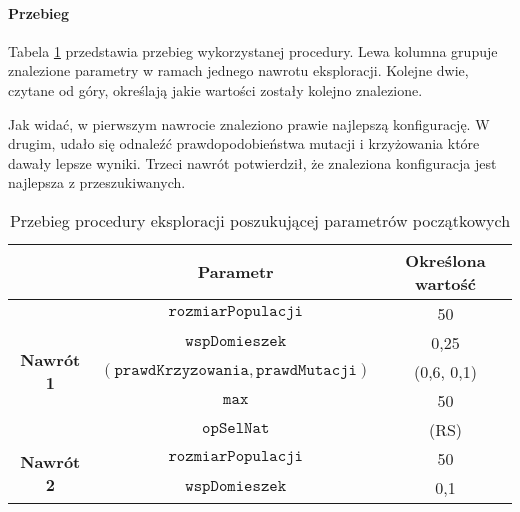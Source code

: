 \documentclass[twoside]{iisthesis}
\newcommand{\param}[1]{\mathtt{#1}}
\newcommand{\opName}[1]{\textproc{#1}}
\begin{document}
\paragraph{Przebieg}

Tabela \ref{table:knapsack_init_flow} przedstawia przebieg wykorzystanej procedury. 
Lewa kolumna grupuje znalezione parametry w ramach jednego nawrotu eksploracji. 
Kolejne dwie, czytane od góry, określają jakie wartości zostały kolejno znalezione.

Jak widać, w pierwszym nawrocie znaleziono prawie najlepszą konfigurację. 
W drugim, udało się odnaleźć prawdopodobieństwa mutacji i krzyżowania które dawały lepsze wyniki.
Trzeci nawrót potwierdził, że znaleziona konfiguracja jest najlepsza z przeszukiwanych.

\begin{table}[h]
	\caption{Przebieg procedury eksploracji poszukującej parametrów początkowych \label{table:knapsack_init_flow}}
	\centering
	\begin{tabular}{c|c|c|}
		\cline{2-3}
		\multicolumn{1}{l|}{}                                 & {\bf Parametr}                                     & {\bf Określona wartość} \\ \hline
		\multicolumn{1}{|c|}{\multirow{5}{*}{{\bf Nawrót 1}}} & $\param{rozmiarPopulacji}$                         & 50                      \\ \cline{2-3} 
		\multicolumn{1}{|c|}{}                                & $\param{wspDomieszek}$                             & 0,25                     \\ \cline{2-3} 
		\multicolumn{1}{|c|}{}                                & $(\param{prawdKrzyzowania}, \param{prawdMutacji})$ & (0,6, 0,1)              \\ \cline{2-3} 
		\multicolumn{1}{|c|}{}                                & $\param{max}$                                      & 50                     \\ \cline{2-3} 
		\multicolumn{1}{|c|}{}                                & $\param{opSelNat}$                                 & \opName{natSel}(RS)                \\ \hline
		\hline
		\multicolumn{1}{|c|}{\multirow{5}{*}{{\bf Nawrót 2}}} & $\param{rozmiarPopulacji}$                         & 50                      \\ \cline{2-3} 
		\multicolumn{1}{|c|}{}                                & $\param{wspDomieszek}$                             & 0,1                     \\ \cline{2-3} 

\end{tabular}
\end{table}
\end{document}
